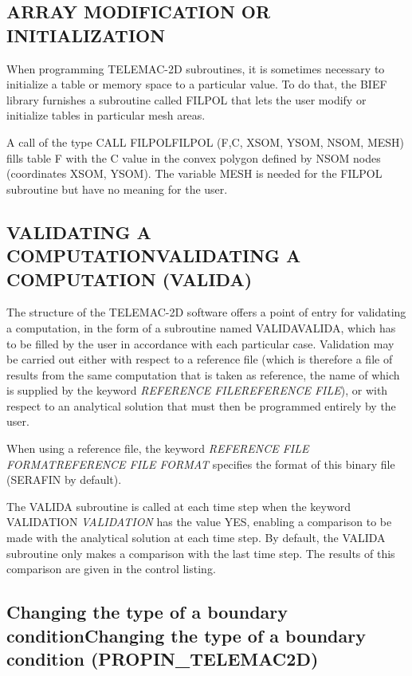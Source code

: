 \documentclass{article} %
\begin{document}
\subsection{ ARRAY MODIFICATION OR INITIALIZATION}

 When programming TELEMAC-2D subroutines, it is sometimes necessary to initialize a table or memory space to a particular value. To do that, the BIEF library furnishes a subroutine called FILPOL that lets the user modify or initialize tables in particular mesh areas.

 A call of the type CALL FILPOLFILPOL (F,C, XSOM, YSOM, NSOM, MESH) fills table F with the C value in the convex polygon defined by NSOM nodes (coordinates XSOM, YSOM). The variable MESH is needed for the FILPOL subroutine but have no meaning for the user.


\subsection{ VALIDATING A COMPUTATIONVALIDATING A COMPUTATION (VALIDA) }

 The structure of the TELEMAC-2D software offers a point of entry for validating a computation, in the form of a subroutine named VALIDAVALIDA, which has to be filled by the user in accordance with each particular case. Validation may be carried out either with respect to a reference file (which is therefore a file of results from the same computation that is taken as reference, the name of which is supplied by the keyword \textit{REFERENCE FILEREFERENCE FILE}), or with respect to an analytical solution that must then be programmed entirely by the user.

 When using a reference file, the keyword \textit{REFERENCE FILE FORMATREFERENCE FILE FORMAT} specifies the format of this binary file (SERAFIN by default).

 The VALIDA subroutine is called at each time step when the keyword VALIDATION \textit{VALIDATION} has the value YES, enabling a comparison to be made with the analytical solution at each time step. By default, the VALIDA subroutine only makes a comparison with the last time step. The results of this comparison are given in the control listing.


\subsection{ Changing the type of a boundary conditionChanging the type of a boundary condition (PROPIN\_TELEMAC2D)}
\end{document}
